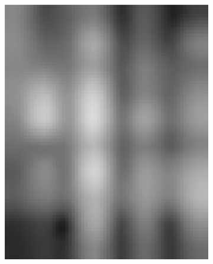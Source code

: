 \begin{figure}[h!]
\begin{subfigure}{0.22\textwidth}
		\includegraphics[width=\linewidth]{Images/KDDProcess/secondFilter}
		\caption{}    %
		\label{subfig:secondFilter}
	\end{subfigure}
	\hfill
	\begin{subfigure}{0.22\textwidth}

\end{subfigure}
\end{figure}
